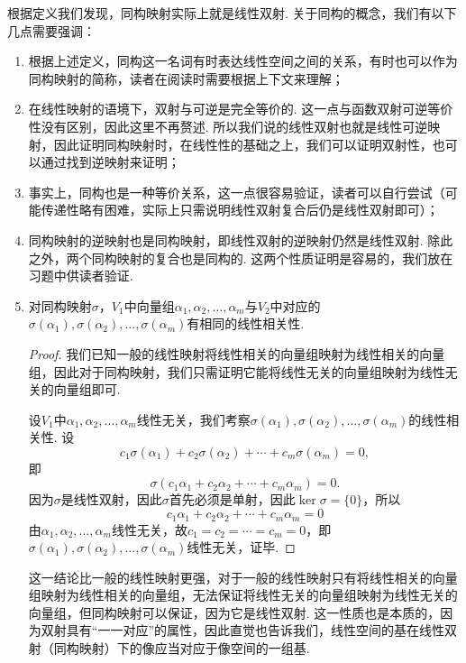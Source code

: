 根据定义我们发现，同构映射实际上就是线性双射. 关于同构的概念，我们有以下几点需要强调：
\begin{enumerate}
    \item 根据上述定义，同构这一名词有时表达线性空间之间的关系，有时也可以作为同构映射的简称，读者在阅读时需要根据上下文来理解；

    \item 在线性映射的语境下，双射与可逆是完全等价的. 这一点与函数双射可逆等价性没有区别，因此这里不再赘述. 所以我们说的线性双射也就是线性可逆映射，因此证明同构映射时，在线性性的基础之上，我们可以证明双射性，也可以通过找到逆映射来证明；

    \item 事实上，同构也是一种等价关系，这一点很容易验证，读者可以自行尝试（可能传递性略有困难，实际上只需说明线性双射复合后仍是线性双射即可）；

    \item 同构映射的逆映射也是同构映射，即线性双射的逆映射仍然是线性双射. 除此之外，两个同构映射的复合也是同构的. 这两个性质证明是容易的，我们放在习题中供读者验证.

    \item 对同构映射$\sigma$，$V_1$中向量组$ \alpha_1,\alpha_2,\ldots,\alpha_m $与$V_2$中对应的$ \sigma(\alpha_1),\sigma(\alpha_2),\ldots,\sigma(\alpha_m) $有相同的线性相关性.

          \begin{proof}
              我们已知一般的线性映射将线性相关的向量组映射为线性相关的向量组，因此对于同构映射，我们只需证明它能将线性无关的向量组映射为线性无关的向量组即可.

              设$V_1$中$\alpha_1,\alpha_2,\ldots,\alpha_m$线性无关，我们考察$\sigma(\alpha_1),\sigma(\alpha_2),\ldots,\sigma(\alpha_m)$的线性相关性. 设
              \[c_1\sigma(\alpha_1)+c_2\sigma(\alpha_2)+\cdots+c_m\sigma(\alpha_m)=0,\]
              即
              \[\sigma(c_1\alpha_1+c_2\alpha_2+\cdots+c_m\alpha_m)=0.\]
              因为$\sigma$是线性双射，因此$\sigma$首先必须是单射，因此$\ker\sigma=\{0\}$，所以
              \[c_1\alpha_1+c_2\alpha_2+\cdots+c_m\alpha_m=0\]
              由$\alpha_1,\alpha_2,\ldots,\alpha_m$线性无关，故$c_1=c_2=\cdots=c_m=0$，即$\sigma(\alpha_1),\sigma(\alpha_2),\ldots,\sigma(\alpha_m)$线性无关，证毕.
          \end{proof}

          这一结论比一般的线性映射更强，对于一般的线性映射只有将线性相关的向量组映射为线性相关的向量组，无法保证将线性无关的向量组映射为线性无关的向量组，但同构映射可以保证，因为它是线性双射. 这一性质也是本质的，因为双射具有``一一对应''的属性，因此直觉也告诉我们，线性空间的基在线性双射（同构映射）下的像应当对应于像空间的一组基.


\end{enumerate}
